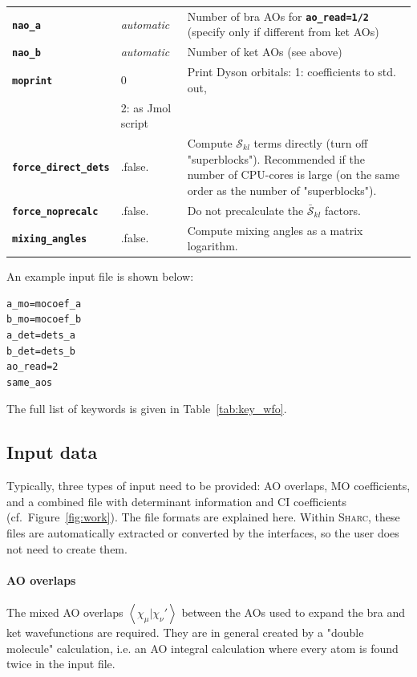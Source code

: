 \documentclass[a4paper,10pt,DIV=15,openany,twoside=false]{scrbook}
\newcommand{\sharc}{\textsc{Sharc}}
\newcommand{\ttt}[1]{\textbf{\texttt{#1}}}
\newenvironment{example}{
  \setlength{\OuterFrameSep}{3pt}
  \vspace{0mm}
  \definecolor{shadecolor}{HTML}{E4F4FF}
  \begin{shaded}
}{
  \end{shaded}
}
\begin{document}
\begin{table}[tb]
\begin{tabular}{llp{9cm}}
    \ttt{nao\_a}                & \textit{automatic}            & Number of bra AOs for \ttt{ao\_read=1/2} (specify only if different from ket AOs) \\
    \ttt{nao\_b}                & \textit{automatic}            & Number of ket AOs (see above)  \\
    \ttt{moprint}               & 0                             & Print Dyson orbitals: 1: coefficients to std. out,\\
                                                                & 2: as Jmol script\\
    \ttt{force\_direct\_dets}   & .false.                       & Compute $\mathcal{S}_{kl}$ terms directly (turn off "superblocks").
                                                                Recommended if the number of CPU-cores is large (on the same order as the number of "superblocks").\\
    \ttt{force\_noprecalc}      & .false.                       & Do not precalculate the $\bar{\mathcal{S}}_{kl}$ factors.\\
    \ttt{mixing\_angles}        & .false.                       & Compute mixing angles as a matrix logarithm.\\
    \hline
  \end{tabular}
\end{table}

An example input file is shown below:
%
\begin{example}
\begin{verbatim}
a_mo=mocoef_a
b_mo=mocoef_b
a_det=dets_a
b_det=dets_b
ao_read=2
same_aos
\end{verbatim}
\end{example}
The full list of keywords is given in Table~\ref{tab:key_wfo}.



\subsection{Input data}
Typically, three types of input need to be provided: AO overlaps, MO coefficients, and a combined file with determinant information and CI coefficients (cf.~Figure~\ref{fig:work}).
The file formats are explained here.
Within \sharc, these files are automatically extracted or converted by the interfaces, so the user does not need to create them.

\paragraph{AO overlaps}
The mixed AO overlaps $\left<\chi_{\mu}|\chi_{\nu}'\right>$ between the AOs used to expand the bra and ket wavefunctions are required.
They are in general created by a "double molecule" calculation, i.e. an AO integral calculation where every atom is found twice in the input file.
\end{document}
